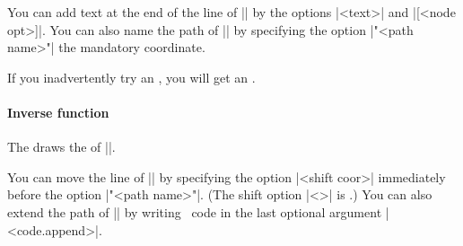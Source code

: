 You can add text at the end of the line of |\tzLFn| by the options |{<text>}| and |[<node opt>]|. You can also name the path of |\tzLFn| by specifying the option |"<path name>"|  the mandatory coordinate.

\begin{tzcode}{.3}
\end{tzcode}


\begin{tzcode}{.3}
\end{tzcode}

\remark If you inadvertently try an , you will get an .

\paragraph{Inverse function} The   draws the  of |\tzLFn|.

\begin{tzcode}{.3}
\end{tzcode}


You can move the line of |\tzLFn| by specifying the option |<shift coor>| immediately before the option |"<path name>"|. (The  shift option |<>| is .)
You can also extend the path of |\tzLFn| by writing \Tikz\ code in the last optional argument |<code.append>|.

\begin{tzcode}{.3}
\end{tzcode}

